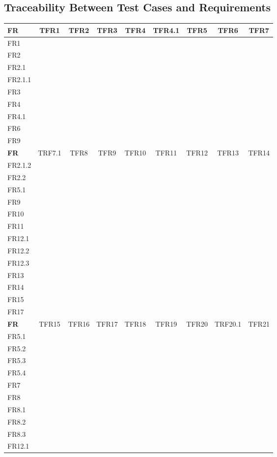 \documentclass[12pt, titlepage]{article}
\begin{document}
\subsection{Traceability Between Test Cases and Requirements}
    \newpage
    \FloatBarrier
	\begin{longtable}{|l|cccccccc|}
	\hline
	\textbf{FR}&TFR1&TFR2&TFR3&TFR4&TFR4.1&TFR5&TFR6&TFR7\\
	\hline
	FR1&\checkmark&&&&&&&\\
	FR2&\checkmark&&&&&&&\\
	FR2.1&&\checkmark&&&&&&\\
	FR2.1.1&&&\checkmark&\checkmark&\checkmark&&&\\
	FR3&&&\checkmark&\checkmark&\checkmark&&&\\
	FR4&&&\checkmark&\checkmark&\checkmark&&&\\
	FR4.1&&&&&&\checkmark&&\\
	FR6&&&&&&&\checkmark&\\
	FR9&&&&&&&&\checkmark\\
	\hline
	\hline
	\textbf{FR}&TRF7.1&TFR8&TFR9&TFR10&TFR11&TFR12&TFR13&TFR14\\
	\hline
	FR2.1.2&&&&&&\checkmark&&\\
	FR2.2&&&&&&&\checkmark&\\
	FR5.1&&&&&&&&\checkmark\\
	FR9&\checkmark&&&&&&&\\
	FR10&&\checkmark&&&&&&\\
	FR11&&&\checkmark&&&&&\\
	FR12.1&&&&&&&&\checkmark\\
	FR12.2&&&&&&\checkmark&&\\
	FR12.3&&&&&&&&\checkmark\\
	FR13&&&&&&&&\checkmark\\
	FR14&&&&\checkmark&&&&\\
	FR15&&\checkmark&\checkmark&&&&&\\
	FR17&&&&&\checkmark&&&\\
	\hline
	\hline
	\textbf{FR}&TFR15&TFR16&TFR17&TFR18&TFR19&TFR20&TRF20.1&TFR21\\
	\hline
	FR5.1&&\checkmark&&&&&&\\
	FR5.2&&&\checkmark&&&&&\\
	FR5.3&&&&\checkmark&&&&\\
	FR5.4&&&&&\checkmark&&&\\
	FR7&&&&&&\checkmark&\checkmark&\\
	FR8&&&&&&&&\checkmark\\
	FR8.1&&&&&&&&\checkmark\\
	FR8.2&&&&&&&&\checkmark\\
	FR8.3&&&&&&&&\checkmark\\
	FR12.1&\checkmark&&&&&&&\\
	\hline
    \end{longtable}
\end{document}
